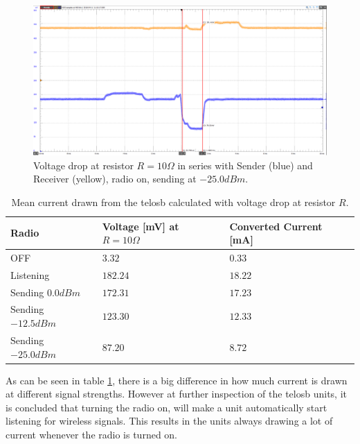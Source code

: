 \begin{figure}[h]
	\centering
	\includegraphics[width=1\linewidth]{implementation/energylab/fig/radioOn_sendLowSignal.png}
	\caption{Voltage drop at resistor $R=10\Omega$ in series with Sender (blue) and Receiver (yellow), radio on, sending at $-25.0dBm$.}
	\label{fig:radioOn_sendLowSignal}
\end{figure}

\begin{table}[h]
	\centering
	\begin{tabularx}{\linewidth}{|X|X|X|}
		\hline
		Radio				& Voltage [mV] at $R=10\Omega$	& Converted Current [mA]	\\ \hline
		OFF					& $3.32$						& $0.33$					\\ \hline
		Listening			& $182.24$						& $18.22$					\\ \hline
		Sending $0.0dBm$	& $172.31$						& $17.23$					\\ \hline
		Sending $-12.5dBm$	& $123.30$						& $12.33$					\\ \hline
		Sending $-25.0dBm$	& $87.20$						& $8.72$					\\ \hline
	\end{tabularx}
	\caption{Mean current drawn from the telosb calculated with voltage drop at resistor $R$.}
	\label{tab:signalStrengthEnergyConsumption}
\end{table}

\noindent As can be seen in table \ref{tab:signalStrengthEnergyConsumption}, there is a big difference in how much current is drawn at different signal strengths. However at further inspection of the telosb units, it is concluded that turning the radio on, will make a unit automatically start listening for wireless signals. This results in the units always drawing a lot of current whenever the radio is turned on.

